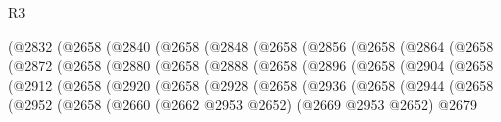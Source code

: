 \begin{lexlean}{R3}
\begin{coremodule}
                      (@2832
                        (@2658
                          (@2840
                            (@2658
                              (@2848
                                (@2658
                                  (@2856
                                    (@2658
                                      (@2864
                                        (@2658
                                          (@2872
                                            (@2658
                                              (@2880
                                                (@2658
                                                  (@2888
                                                    (@2658
                                                      (@2896
                                                        (@2658
                                                          (@2904
                                                            (@2658
                                                              (@2912
                                                                (@2658
                                                                  (@2920
                                                                    (@2658
                                                                      (@2928
                                                                        (@2658
                                                                          (@2936
                                                                            (@2658
                                                                              (@2944
                                                                                (@2658
                                                                                  (@2952
                                                                                    (@2658
                                                                                      (@2660
                                                                                        (@2662
                                                                                          @2953
                                                                                          @2652)
                                                                                        (@2669
                                                                                          @2953
                                                                                          @2652)
                                                                                        @2679

\end{coremodule}
\end{lexlean}
